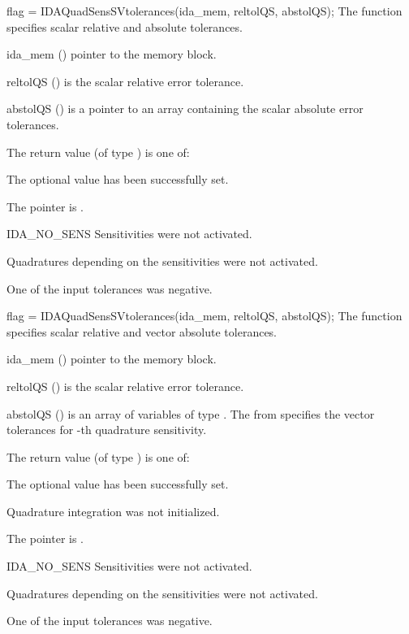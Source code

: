 {
 flag = IDAQuadSensSVtolerances(ida\_mem, reltolQS, abstolQS);
}
{
  The function  specifies scalar relative and absolute
  tolerances.
}
{
  \begin{args}[abstolQS]
  \item[ida\_mem] ()
    pointer to the {\idas} memory block.
  \item[reltolQS] ()
    is the scalar relative error tolerance.
  \item[abstolQS] ()
    is a pointer to an array containing the  scalar absolute 
    error tolerances.
  \end{args}
}
{
  The return value  (of type ) is one of:
  \begin{args}
  \item[\Id{IDA\_SUCCESS}] 
    The optional value has been successfully set.
  \item[\Id{IDA\_MEM\_NULL}]
    The  pointer is .
  \item[IDA\_NO\_SENS]
    Sensitivities were not activated.
  \item[\Id{IDA\_NO\_QUADSENS}] 
    Quadratures depending on the sensitivities were not activated.
  \item[\Id{IDA\_ILL\_INPUT}] 
    One of the input tolerances was negative.
  \end{args}
}
{}

{
 flag = IDAQuadSensSVtolerances(ida\_mem, reltolQS, abstolQS);
}
{
  The function  specifies scalar relative and 
  vector absolute tolerances.
}
{
  \begin{args}[reltolQS]
  \item[ida\_mem] ()
    pointer to the {\idas} memory block.
  \item[reltolQS] ()
    is the scalar relative error tolerance.
  \item[abstolQS] ()
    is an array of  variables of type . The  from
     specifies the vector tolerances for -th quadrature 
    sensitivity.
  \end{args}
}
{
  The return value  (of type ) is one of:
  \begin{args}
  \item[\Id{IDA\_SUCCESS}] 
    The optional value has been successfully set.
  \item[\Id{IDA\_NO\_QUAD}]
    Quadrature integration was not initialized.
  \item[\Id{IDA\_MEM\_NULL}]
    The  pointer is .
  \item[IDA\_NO\_SENS]
    Sensitivities were not activated.
  \item[\Id{IDA\_NO\_QUADSENS}] 
    Quadratures depending on the sensitivities were not activated.
  \item[\Id{IDA\_ILL\_INPUT}] 
    One of the input tolerances was negative.
  \end{args}
}
{}

